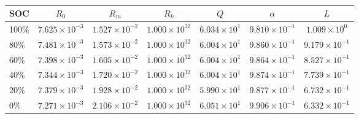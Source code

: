 
\begin{table*}[!htb]
\centering
\begin{tabular}{l|cccccc}
\toprule
\textbf{SOC} & $R_0$ & $R_m$ & $R_k$ & $Q$ & $\alpha$ & $L$ \\
\midrule
100\% & $7.625 \times 10^{-3}$ & $1.527 \times 10^{-2}$ & $1.000 \times 10^{32}$ & $6.034 \times 10^{1}$ & $9.810 \times 10^{-1}$ & $1.009 \times 10^{0}$ \\ 
80\% & $7.481 \times 10^{-3}$ & $1.573 \times 10^{-2}$ & $1.000 \times 10^{32}$ & $6.004 \times 10^{1}$ & $9.860 \times 10^{-1}$ & $9.179 \times 10^{-1}$ \\ 
60\% & $7.398 \times 10^{-3}$ & $1.605 \times 10^{-2}$ & $1.000 \times 10^{32}$ & $6.004 \times 10^{1}$ & $9.864 \times 10^{-1}$ & $8.527 \times 10^{-1}$ \\ 
40\% & $7.344 \times 10^{-3}$ & $1.720 \times 10^{-2}$ & $1.000 \times 10^{32}$ & $6.004 \times 10^{1}$ & $9.874 \times 10^{-1}$ & $7.739 \times 10^{-1}$ \\ 
20\% & $7.379 \times 10^{-3}$ & $1.928 \times 10^{-2}$ & $1.000 \times 10^{32}$ & $5.990 \times 10^{1}$ & $9.877 \times 10^{-1}$ & $6.732 \times 10^{-1}$ \\ 
0\% & $7.271 \times 10^{-3}$ & $2.106 \times 10^{-2}$ & $1.000 \times 10^{32}$ & $6.051 \times 10^{1}$ & $9.906 \times 10^{-1}$ & $6.332 \times 10^{-1}$ \\ 

\bottomrule
\end{tabular}
\caption{}
\label{}
\end{table*}
